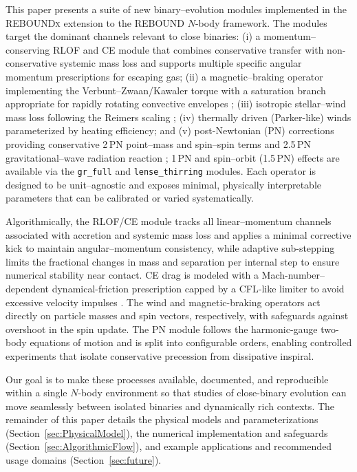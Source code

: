 \documentclass[11pt]{article}
\begin{document}
This paper presents a suite of new binary–evolution modules implemented in the \textsc{REBOUNDx} extension to the \textsc{REBOUND} $N$-body framework. The modules target the dominant channels relevant to close binaries: (i) a momentum–conserving RLOF and CE module that combines conservative transfer with non-conservative systemic mass loss and supports multiple specific angular momentum prescriptions for escaping gas; (ii) a magnetic–braking operator implementing the Verbunt–Zwaan/Kawaler torque with a saturation branch appropriate for rapidly rotating convective envelopes \citep{Verbunt1981,Kawaler1988}; (iii) isotropic stellar–wind mass loss following the Reimers scaling \citep{Reimers1975}; (iv) thermally driven (Parker-like) winds parameterized by heating efficiency; and (v) post-Newtonian (PN) corrections providing conservative 2\,PN point–mass and spin–spin terms and 2.5\,PN gravitational–wave radiation reaction \citep{Peters1964,Kidder1995}; 1\,PN and spin--orbit (1.5\,PN) effects are available via the \texttt{gr\_full} and \texttt{lense\_thirring} modules. Each operator is designed to be unit–agnostic and exposes minimal, physically interpretable parameters that can be calibrated or varied systematically.

Algorithmically, the RLOF/CE module tracks all linear–momentum channels associated with accretion and systemic mass loss and applies a minimal corrective kick to maintain angular–momentum consistency, while adaptive sub-stepping limits the fractional changes in mass and separation per internal step to ensure numerical stability near contact. CE drag is modeled with a Mach-number–dependent dynamical-friction prescription capped by a CFL-like limiter to avoid excessive velocity impulses \citep{Ostriker1999}. The wind and magnetic-braking operators act directly on particle masses and spin vectors, respectively, with safeguards against overshoot in the spin update. The PN module follows the harmonic-gauge two-body equations of motion \citep{Kidder1995} and is split into configurable orders, enabling controlled experiments that isolate conservative precession from dissipative inspiral.

Our goal is to make these processes available, documented, and reproducible within a single $N$-body environment so that studies of close-binary evolution can move seamlessly between isolated binaries and dynamically rich contexts. The remainder of this paper details the physical models and parameterizations (Section~\ref{sec:PhysicalModel}), the numerical implementation and safeguards (Section~\ref{sec:AlgorithmicFlow}), and example applications and recommended usage domains (Section~\ref{sec:future}).
\end{document}
